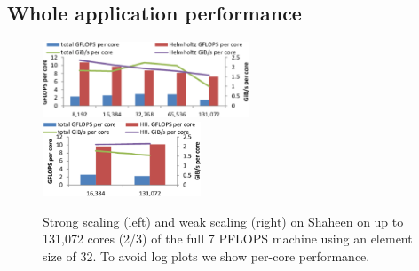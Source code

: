 \subsection{Whole application performance}

\begin{figure}[!t]
\centering
\includegraphics[width=0.55\textwidth]{gfx/shaheen_strong}
~
\includegraphics[width=0.42\textwidth]{gfx/shaheen_weak}
\caption{Strong scaling (left) and weak scaling (right) on Shaheen on up to 131,072  cores (2/3) of the full 7 PFLOPS machine using 
an element size of 32.
To avoid log plots we show per-core performance.}
\label{fig:shaheen_scaling}
\end{figure}

